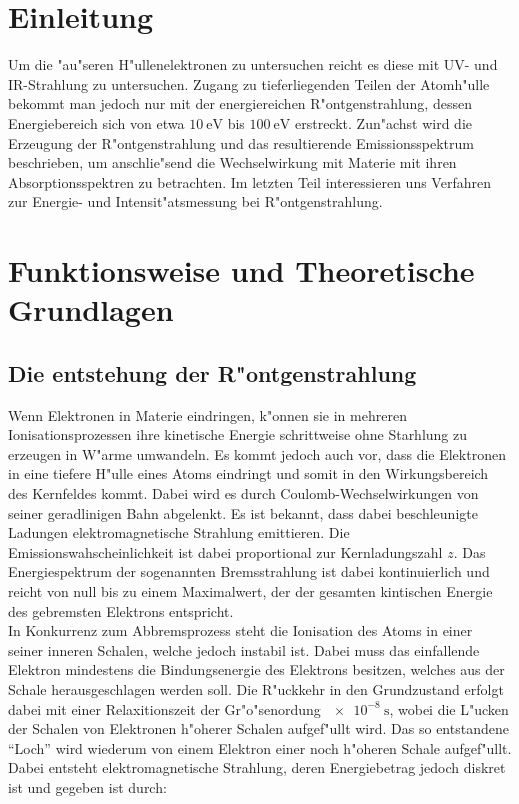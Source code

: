 \section{Einleitung}
\label{sec:einleitung}
	Um die "au"seren H"ullenelektronen zu untersuchen reicht es diese mit UV- und IR-Strahlung zu untersuchen. Zugang zu tieferliegenden Teilen der Atomh"ulle bekommt man jedoch nur mit der energiereichen R"ontgenstrahlung, dessen Energiebereich sich von etwa $\SI{10}{\electronvolt}$ bis $\SI{100}{\electronvolt}$ erstreckt.
	\vspace{0.3cm}
	Zun"achst wird die Erzeugung der R"ontgenstrahlung und das resultierende Emissionsspektrum beschrieben, um anschlie"send die Wechselwirkung mit Materie mit ihren Absorptionsspektren zu betrachten. Im letzten Teil interessieren uns Verfahren zur Energie- und Intensit"atsmessung bei R"ontgenstrahlung.

\section{Funktionsweise und Theoretische Grundlagen}
\label{sec:funktionsweise}

	
	\subsection{Die entstehung der R"ontgenstrahlung}
	\label{sub:entstehung}

		Wenn Elektronen in Materie eindringen, k"onnen sie in mehreren Ionisationsprozessen ihre kinetische Energie schrittweise ohne Starhlung zu erzeugen in W"arme umwandeln.
		Es kommt jedoch auch vor, dass die Elektronen in eine tiefere H"ulle eines Atoms eindringt und somit in den Wirkungsbereich des Kernfeldes kommt.
		Dabei wird es durch Coulomb-Wechselwirkungen von seiner geradlinigen Bahn abgelenkt.
		Es ist bekannt, dass dabei beschleunigte Ladungen elektromagnetische Strahlung emittieren.
		Die E\-mis\-sions\-wah\-schein\-lich\-keit ist dabei proportional zur Kernladungszahl $z$.
		Das Energiespektrum der sogenannten Bremsstrahlung ist dabei kontinuierlich und reicht von null bis zu einem Maximalwert, der der gesamten kintischen Energie des gebremsten Elektrons entspricht.
		\\
		In Konkurrenz zum Abbremsprozess steht die Ionisation des Atoms in einer seiner inneren Schalen, welche jedoch instabil ist.
		Dabei muss das einfallende Elektron min\-des\-tens die Bindungsenergie des Elektrons besitzen, welches aus der Schale herausgeschlagen werden soll.
		Die R"uckkehr in den Grundzustand erfolgt dabei mit einer Relaxitionszeit der Gr"o"senordung $\SI{e-8}{\second}$, wobei die L"ucken der Schalen von Elektronen h"oherer Schalen aufgef"ullt wird. 
		Das so entstandene "`Loch"' wird wiederum von einem Elektron einer noch h"oheren Schale aufgef"ullt.
		Dabei entsteht elektromagnetische Strahlung, deren Energiebetrag jedoch diskret ist und gegeben ist durch:

